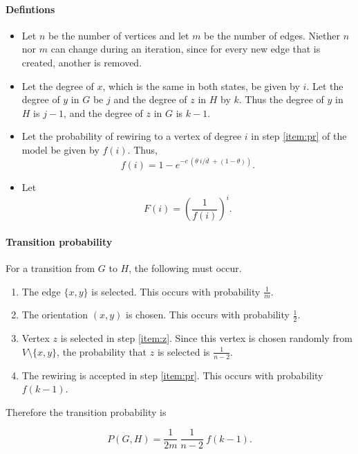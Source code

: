 \documentclass[a4paper,10pt]{article}
\begin{document}
\paragraph{Defintions} 
\begin{itemize}
 \item Let $n$ be the number of vertices and let $m$ be the number of edges. Niether $n$ nor $m$ can change during an iteration, since for every new edge that is created, another is removed.
 \item  Let the degree of $x$, which is the same in both states, be given by $i$. Let the degree of $y$ in $G$ be $j$ and the degree of $z$ in $H$ by $k$. Thus the degree of $y$ in $H$ is $j - 1$, and the degree of $z$ in $G$ is $k - 1$.
 \item Let the probability of rewiring to a vertex of degree $i$ in step \ref{item:pr} of the model be given by $f(i)$. Thus,
\begin{equation}
 f(i) = 1 - e^{-c\,(\theta \: i / \overline{d}\; + (1 - \theta))}.
\end{equation}
 \item Let
 \begin{equation}
  F(i) = \left(\frac{1}{f(i)}\right)^i.
 \end{equation}

\end{itemize}

\paragraph{Transition probability} For a transition from $G$ to $H$, the following must occur.
\begin{enumerate}
 \item The edge $\{x, y\}$ is selected. This occurs with probability $\frac{1}{m}$.
 \item The orientation $(x, y)$ is chosen. This occurs with probability $\frac{1}{2}$.
 \item Vertex $z$ is selected in step \ref{item:z}. Since this vertex is chosen randomly from $V \setminus \{x, y\}$, the probability that $z$ is selected is $\frac{1}{n - 2}$.
 \item The rewiring is accepted in step \ref{item:pr}. This occurs with probability $f(k - 1)$.
\end{enumerate}

\noindent Therefore the transition probability is 

\begin{equation}
 P(G, H) = \frac{1}{2m} \: \frac{1}{n - 2} \: f(k - 1).
\end{equation}
\end{document}
